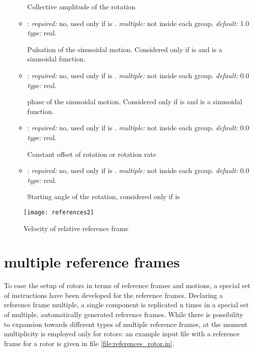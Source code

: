\begin{itemize}
\begin{itemize}
    Collective amplitude of the rotation 
    
    \item {}: \textit{required:} no, used only if  is . \textit{multiple:} not inside each  group. \textit{default:} 1.0 \textit{type:} real.
    
    Pulsation of the sinusoidal motion. Considered only if  is  and  is a sinusoidal function.
    
        \item {}: \textit{required:} no, used only if  is . \textit{multiple:} not inside each  group. \textit{default:} 0.0 \textit{type:} real.
    
    phase of the sinusoidal motion. Considered only if  is  and  is a sinusoidal function.
    
    \item {}: \textit{required:} no, used only if  is . \textit{multiple:} not inside each  group. \textit{default:} 0.0 \textit{type:} real.
    
    Constant offset of rotation or rotation rate
    
    \item {}: \textit{required:} no, used only if  is . \textit{multiple:} not inside each  group. \textit{default:} 0.0 \textit{type:} real.
    
    Starting angle of the rotation, considered only if  is 
    
	\end{itemize}

\end{itemize}

\begin{figure}
\centering
\texttt{[image: references2]}
\caption{Velocity of relative reference frame}
\label{fig:references2}
\end{figure}

\section{multiple reference frames}
To ease the setup of rotors in terms of reference frames and motions, a special set of instructions have been developed for the reference frames. Declaring a reference frame multiple, a single component is replicated n times in a special set of multiple, automatically generated reference frames. 
While there is possibility to expansion towards different types of multiple reference frames, at the moment multiplicity is employed only for rotors: an example input file with a reference frame for a rotor is given in file \ref{file:references_rotor.in}. 

